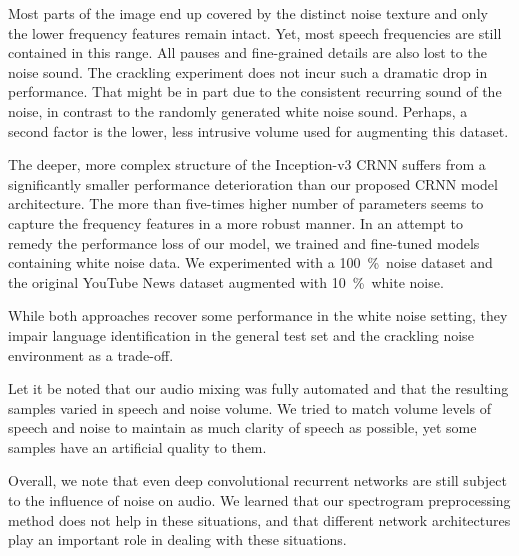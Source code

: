 %
Most parts of the image end up covered by the distinct noise texture and only the lower frequency features remain intact. Yet, most speech frequencies are still contained in this range. All pauses and fine-grained details are also lost to the noise sound. The crackling experiment does not incur such a dramatic drop in performance. That might be in part due to the consistent recurring sound of the noise, in contrast to the randomly generated white noise sound. Perhaps, a second factor is the lower, less intrusive volume used for augmenting this dataset.

The deeper, more complex structure of the Inception-v3 CRNN suffers from a significantly smaller performance deterioration than our proposed CRNN model architecture. The more than five-times higher number of parameters seems to capture the frequency features in a more robust manner. In an attempt to remedy the performance loss of our model, we trained and fine-tuned models containing white noise data. We experimented with a \SI{100}{\percent}~noise dataset and the original YouTube News dataset augmented with \SI{10}{\percent}~white noise. 

While both approaches recover some performance in the white noise setting, they impair language identification in the general test set and the crackling noise environment as a trade-off.

Let it be noted that our audio mixing was fully automated and that the resulting samples varied in speech and noise volume. We tried to match volume levels of speech and noise to maintain as much clarity of speech as possible, yet some samples have an artificial quality to them.



Overall, we note that even deep convolutional recurrent networks are still subject to the influence of noise on audio. We learned that our spectrogram preprocessing method does not help in these situations, and that different network architectures play an important role in dealing with these situations.



